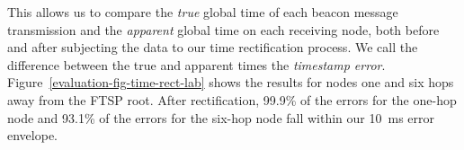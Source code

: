 This allows us to compare the {\em true} global time of each beacon message
transmission and the {\em apparent} global time on each receiving node, both
before and after subjecting the data to our time rectification process.  We
call the difference between the true and apparent times the {\em timestamp
error}. Figure~\ref{evaluation-fig-time-rect-lab} shows the results for nodes
one and six hops away from the FTSP root.  After rectification, 99.9\% of the
errors for the one-hop node and 93.1\% of the errors for the six-hop node
fall within our 10~ms error envelope.



